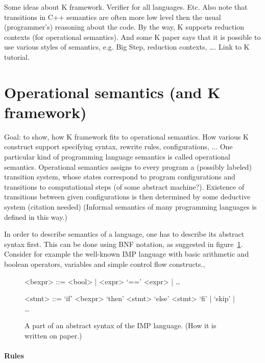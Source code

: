\documentclass{fithesis3}
\begin{document}
Some ideas about K framework. Verifier for all languages. Etc. Also note that transitions in C++ semantics are often more low level then the usual (programmer's) reasoning about the code. By the way, K supports reduction contexts (for operational semantics). And some K paper says that it is possible to use various styles of semantics, e.g. Big Step, reduction contexts, \ldots . Link to K tutorial.

\section{Operational semantics (and K framework)}
Goal: to show, how K framework fits to operational semantics. How various K construct support specifying syntax, rewrite rules, configurations, ...
One particular kind of programming language semantics is called operational semantics. Operational semantics assigns to every program a (possibly labeled) transition system, whose states correspond to program configurations and transitions to computational steps (of some abstract machine?). Existence of transitions between given configurations is then determined by some deductive system (citation needed) (Informal semantics of many programming languages is defined in this way.) 


In order to describe semantics of a language, one has to describe its abstract syntax first. This can be done using BNF notation, as suggested in figure~\ref{IMPSyntaxOnPaper}. Consider for example the well-known IMP language with basic arithmetic and boolean operators, variables and simple control flow constructs., 

\begin{figure}[H]
\begin{grammar}
<bexpr> ::= <bool> | <expr> `==' <expr> | \ldots

<stmt> ::= `if' <bexpr> `then' <stmt> `else' <stmt> `fi' | `skip' | \ldots

\end{grammar}
\caption{
	A part of an abstract syntax of the IMP language. (How it is written on paper.)
}
\label{IMPSyntaxOnPaper}
\end{figure}

\paragraph{Rules}
\end{document}
